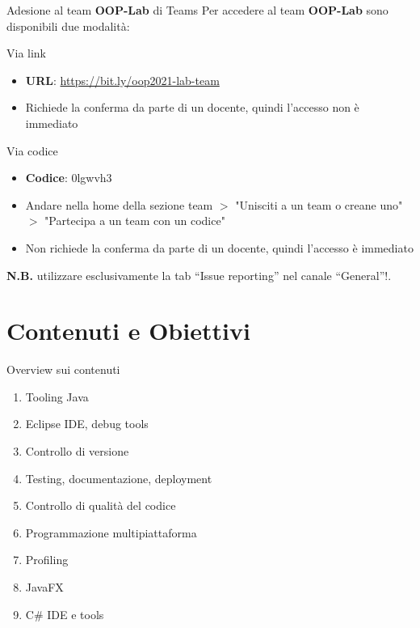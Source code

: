 \documentclass[xcolor=dvipsnames,presentation]{beamer}
\begin{document}
\begin{frame}{Adesione al team \textbf{OOP-Lab} di Teams}
    Per accedere al team \textbf{OOP-Lab} sono disponibili due modalità:
    \begin{block}{Via link}
        \begin{itemize}
            \item \textbf{URL}: \url{https://bit.ly/oop2021-lab-team}
            \item Richiede la conferma da parte di un docente, quindi l'accesso non è immediato
        \end{itemize}
    \end{block}
    \begin{block}{Via codice}
        \begin{itemize}
            \item \textbf{Codice}: 0lgwvh3
            \item Andare nella home della sezione team $>$ "Unisciti a un team o creane uno" $>$ "Partecipa a un team con un codice"
	    \item Non richiede la conferma da parte di un docente, quindi l'accesso è immediato
        \end{itemize}
    \end{block}
    \textbf{N.B.} utilizzare esclusivamente la tab ``Issue reporting'' nel canale ``General''!.
\end{frame}


\section{Contenuti e Obiettivi}

\begin{frame}{Overview sui contenuti}

\begin{enumerate}
    \item Tooling Java
    \item Eclipse IDE, debug tools
    \item Controllo di versione
    \item Testing, documentazione, deployment
    \item Controllo di qualità del codice
    \item Programmazione multipiattaforma
    \item Profiling
    \item JavaFX
    \item C\# IDE e tools
\end{enumerate}

\end{frame}
\end{document}
